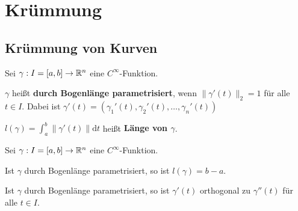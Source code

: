 \chapter{Krümmung}
\section{Krümmung von Kurven}\label{sec:Kurvenkrümmung}
\begin{definition}%
    Sei $\gamma: I = [a, b] \rightarrow \mathbb{R}^n$ eine $C^\infty$-Funktion.
    
    \begin{defenum}
        \item $\gamma$ heißt \textbf{durch Bogenlänge parametrisiert},
              wenn $\|\gamma'(t)\|_2 = 1$ für alle $t \in I$. Dabei
              ist $\gamma'(t) = \left (\gamma_1'(t), \gamma_2'(t), \dots, \gamma_n'(t) \right)$
        \item $l(\gamma) = \int_a^b \|\gamma'(t)\| \mathrm{d} t$ heißt
              \textbf{Länge von $\gamma$}.
    \end{defenum}    
\end{definition}

\begin{bemerkung}%
    Sei $\gamma: I = [a, b] \rightarrow \mathbb{R}^n$ eine $C^\infty$-Funktion.

    \begin{bemenum}
        \item Ist $\gamma$ durch Bogenlänge parametrisiert, so ist $l(\gamma) = b-a$.
        \item \label{bem:16.1d} Ist $\gamma$ durch Bogenlänge parametrisiert, so ist 
              $\gamma'(t)$ orthogonal zu $\gamma''(t)$ für alle $t \in I$.
    \end{bemenum}
\end{bemerkung}

